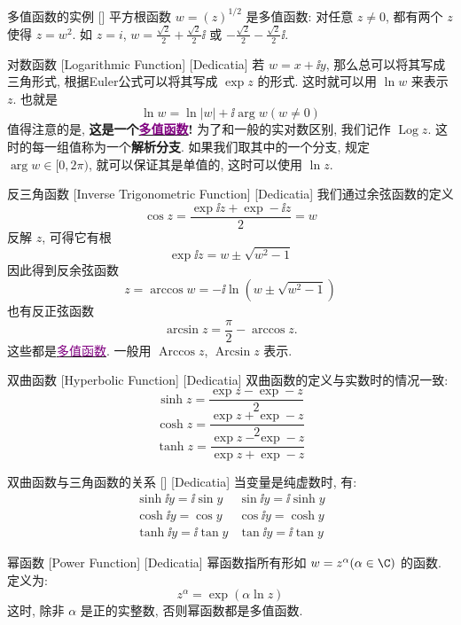 \documentclass[UTF8]{ctexart}
\newcommand{\hyperrefc}[2]{\hyperref[#1]{\textcolor{purple}{#2}}}
\DeclareMathOperator{\Log}{Log}
\begin{document}
\begin{xmp}
    {多值函数的实例}
    []
    平方根函数 \( w=(z)^{1/2} \) 是多值函数: 对任意 \( z\neq 0 \), 都有两个 \( z \) 使得 \( z=w^2 \). 如 \( z=i \),  \( w=\frac{\sqrt{2}}{2}+\frac{\sqrt{2}}{2}\ii \) 或 \( -\frac{\sqrt{2}}{2}-\frac{\sqrt{2}}{2}\ii \).
\end{xmp}
\begin{dfn}
    [Logarithmic]
    {对数函数}
    [Logarithmic Function]
    [Dedicatia]
    若 \( w=x+\ii y \), 那么总可以将其写成三角形式, 根据Euler公式可以将其写成 \( \exp z \) 的形式. 这时就可以用 \( \ln w \) 来表示 \( z \). 也就是
    \[\ln w=\ln|w|+\ii\arg w (w\neq 0)\]
    值得注意的是, \textbf{这是一个\hyperrefc{dfn:Multivalued}{多值函数}! }为了和一般的实对数区别, 我们记作 \( \Log z \). 这时的每一组值称为一个\textbf{解析分支}. 如果我们取其中的一个分支, 规定 \( \arg w\in[0,2\pi) \), 就可以保证其是单值的, 这时可以使用 \( \ln z \).
\end{dfn}
\begin{dfn}
    [InverseTriangular]
    {反三角函数}
    [Inverse Trigonometric Function]
    [Dedicatia]
    我们通过余弦函数的定义
    \[\cos z=\frac{\exp\ii z+\exp -\ii z}{2}=w\]
    反解 \( z \), 可得它有根
    \[\exp\ii z=w\pm\sqrt{w^2-1}\]
    因此得到反余弦函数
    \[z=\arccos w=-\ii\ln(w\pm\sqrt{w^2-1})\]
    也有反正弦函数
    \[\arcsin z=\frac{\pi}{2}-\arccos z.\]
    这些都是\hyperrefc{dfn:Multivalued}{多值函数}. 一般用 \( \operatorname{Arccos}z \),  \( \operatorname{Arcsin}z \) 表示. \\
\end{dfn}
\begin{dfn}
    [HyperbolicFunction]
    {双曲函数}
    [Hyperbolic Function]
    [Dedicatia]
    双曲函数的定义与实数时的情况一致: 
    \[\sinh z=\frac{\exp z-\exp -z}{2}\]
    \[\cosh z=\frac{\exp z+\exp -z}{2}\]
    \[\tanh z=\frac{\exp z-\exp -z}{\exp z+\exp -z}\]
\end{dfn}
\begin{ppt}
    [UUID]
    {双曲函数与三角函数的关系}
    []
    [Dedicatia]
    当变量是纯虚数时, 有: 
    \[\begin{array}{cc}
        \sinh\ii y=\ii\sin y&\sin\ii y=\ii\sinh y\\
        \cosh\ii y=\cos y&\cos\ii y=\cosh y\\
        \tanh\ii y=\ii\tan y&\tan\ii y=\ii\tan y
    \end{array}\]
\end{ppt}
\begin{dfn}
    [UUID]
    {幂函数}
    [Power Function]
    [Dedicatia]
    幂函数指所有形如 \( w=z^\alpha (\alpha\in\C) \) 的函数. 定义为: 
    \[z^\alpha = \exp(\alpha \ln z)\]
    这时, 除非 \( \alpha \) 是正的实整数, 否则幂函数都是多值函数. 
\end{dfn}
\end{document}

